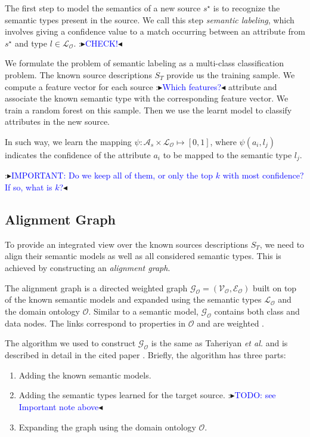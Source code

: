 \documentclass[letterpaper]{article} %
\newcommand{\authornote}[3]{
  {\fbox{\sc 
  #1}:$\blacktriangleright$\textcolor{#2}{\small{#3}}$\blacktriangleleft$}%
}
\newcommand{\ddg}[1]{\authornote{DDG}{blue}{#1}}
\newcommand{\etal}{\textit{et al.}}
\begin{document}
The first step to model the semantics of a new source $s^\star$ is to recognize 
the semantic types present in the source. 
We call this step \emph{semantic labeling}, which involves giving a confidence 
value to a match occurring between an attribute from $s^\star$ and type $l \in 
\mathcal{L_O}$. \ddg{CHECK!}

We formulate the problem of semantic labeling as a multi-class classification
problem. The known source descriptions $S_T$ provide us the training sample. We
compute a feature vector for each source \ddg{Which features?} attribute and 
associate the known
semantic type with the corresponding feature vector. We train a random forest
on this sample. Then we use the learnt model to classify attributes in the new
source.

In such way, we learn the mapping $\psi : \mathcal{A}_s \times \mathcal{L_O} 
\mapsto [0, 1]$,
where $\psi(a_i,l_j)$ indicates the confidence of the attribute $a_i$ to be 
mapped to the semantic type $l_j$.

\ddg{IMPORTANT: Do we keep all of them, or only the top $k$ with most 
confidence? If so, 
what is $k$?}



\subsection{Alignment Graph}

To provide an integrated view over the known sources descriptions $S_T$, we 
need to align their semantic models as well as all considered semantic 
types. This is achieved by constructing an \emph{alignment graph}. 

The alignment graph is a directed weighted graph $\mathcal{G_O} = 
(\mathcal{V_O},\mathcal{E_O})$ built on top 
of the known semantic models and expanded using the semantic types 
$\mathcal{L_O}$ and the domain ontology $\mathcal{O}$. Similar to a semantic 
model, $\mathcal{G_O}$ contains both class and data nodes. The links correspond 
to properties in  $\mathcal{O}$ and are weighted \cite{taheriyan2016learning}.

The algorithm we used to construct $\mathcal{G_O}$ is the same as Taheriyan 
\etal{} and is described in detail in the cited paper 
\cite{taheriyan2016learning}.
Briefly, the algorithm has three parts:
\begin{enumerate}
\item Adding the known semantic models.
\item Adding the semantic types learned for the target source. \ddg{TODO: see 
Important note above}
\item Expanding the graph using the domain ontology $\mathcal{O}$.
\end{enumerate}
\end{document}
